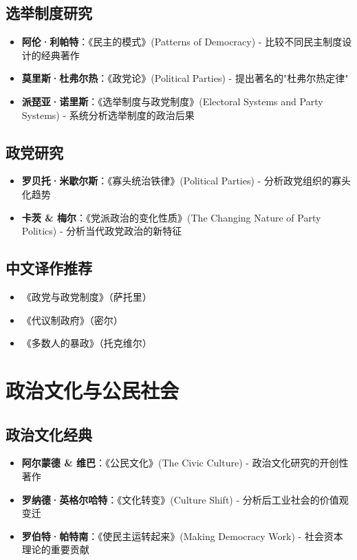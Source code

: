 \subsection{选举制度研究}
\begin{itemize}
    \item \textbf{阿伦·利帕特}：《民主的模式》(Patterns of Democracy)
    \quad - 比较不同民主制度设计的经典著作
    \item \textbf{莫里斯·杜弗尔热}：《政党论》(Political Parties)
    \quad - 提出著名的"杜弗尔热定律"
    \item \textbf{派琵亚·诺里斯}：《选举制度与政党制度》(Electoral Systems and Party Systems)
    \quad - 系统分析选举制度的政治后果
\end{itemize}

\subsection{政党研究}
\begin{itemize}
    \item \textbf{罗贝托·米歇尔斯}：《寡头统治铁律》(Political Parties)
    \quad - 分析政党组织的寡头化趋势
    \item \textbf{卡茨 \& 梅尔}：《党派政治的变化性质》(The Changing Nature of Party Politics)
    \quad - 分析当代政党政治的新特征
\end{itemize}

\subsection{中文译作推荐}
\begin{itemize}
    \item 《政党与政党制度》（萨托里）
    \item 《代议制政府》（密尔）
    \item 《多数人的暴政》（托克维尔）
\end{itemize}

\section{政治文化与公民社会}

\subsection{政治文化经典}
\begin{itemize}
    \item \textbf{阿尔蒙德 \& 维巴}：《公民文化》(The Civic Culture)
    \quad - 政治文化研究的开创性著作
    \item \textbf{罗纳德·英格尔哈特}：《文化转变》(Culture Shift)
    \quad - 分析后工业社会的价值观变迁
    \item \textbf{罗伯特·帕特南}：《使民主运转起来》(Making Democracy Work)
    \quad - 社会资本理论的重要贡献
\end{itemize}

